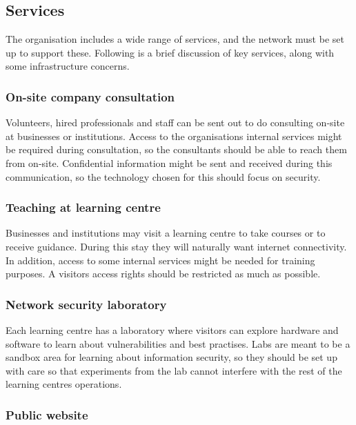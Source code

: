 \subsection{Services}

The organisation includes a wide range of services, and the network must be set up to support these. Following is a brief discussion of key services, along with some infrastructure concerns.


\subsubsection{On-site company consultation}

Volunteers, hired professionals and staff  can be sent out to do consulting on-site at businesses or institutions. Access to the organisations internal services might be required during consultation, so the consultants should be able to reach them from on-site. Confidential information might be sent and received during this communication, so the technology chosen for this should focus on security.

\subsubsection{Teaching at learning centre}

Businesses and institutions may visit a learning centre to take courses or to receive guidance. During this stay they will naturally want internet connectivity. In addition, access to some internal services might be needed for training purposes. A visitors access rights should be restricted as much as possible.

\subsubsection{Network security laboratory}

Each learning centre has a laboratory where visitors can explore hardware and software to learn about vulnerabilities and best practises. Labs are meant to be a sandbox area for learning about information security, so they should be set up with care so that experiments from the lab cannot interfere with the rest of the learning centres operations.


\subsubsection{Public website}

